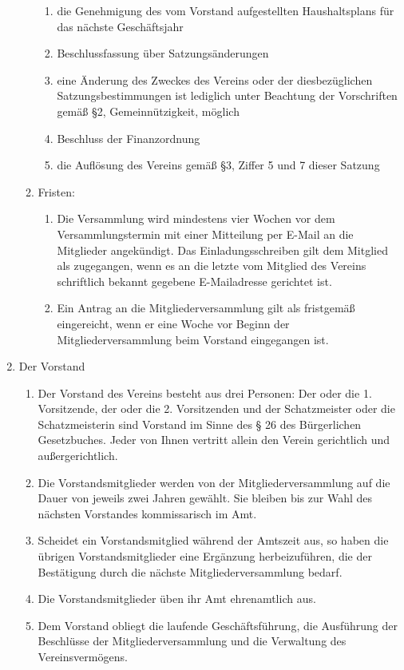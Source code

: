 \documentclass[parskip=half]{scrartcl}
\begin{document}
\begin{contract}
\begin{enumerate}
\begin{enumerate}
\begin{enumerate}
					\item die Genehmigung des vom Vorstand aufgestellten Haushaltsplans für das nächste Geschäftsjahr
					\item Beschlussfassung über Satzungsänderungen
					\item eine Änderung des Zweckes des Vereins oder der diesbezüglichen Satzungsbestimmungen ist lediglich unter Beachtung der Vorschriften gemäß §2, Gemeinnützigkeit, möglich
					\item Beschluss der Finanzordnung
					\item die Auflösung des Vereins gemäß §3, Ziffer 5 und 7 dieser Satzung
				\end{enumerate}
				\item Fristen:
				\begin{enumerate}
					\item Die Versammlung wird mindestens vier Wochen vor dem Versammlungstermin mit einer Mitteilung per E-Mail an die Mitglieder angekündigt. Das Einladungsschreiben gilt dem Mitglied als zugegangen, wenn es an die letzte vom Mitglied des Vereins schriftlich bekannt gegebene E-Mailadresse gerichtet ist.
					\item Ein Antrag an die Mitgliederversammlung gilt als fristgemäß eingereicht, wenn er eine Woche vor Beginn der Mitgliederversammlung beim Vorstand eingegangen ist.
				\end{enumerate}
			\end{enumerate}
			\item Der Vorstand
			\begin{enumerate}
				\item Der Vorstand des Vereins besteht aus drei Personen: Der oder die 1. Vorsitzende, der oder die 2. Vorsitzenden und der Schatzmeister oder die Schatzmeisterin sind Vorstand im Sinne des § 26 des Bürgerlichen Gesetzbuches. Jeder von Ihnen vertritt allein den Verein gerichtlich und außergerichtlich.
				\item Die Vorstandsmitglieder werden von der Mitgliederversammlung auf die Dauer von jeweils zwei Jahren gewählt. Sie bleiben bis zur Wahl des nächsten Vorstandes kommissarisch im Amt.
				\item Scheidet ein Vorstandsmitglied während der Amtszeit aus, so haben die übrigen Vorstandsmitglieder eine Ergänzung herbeizuführen, die der Bestätigung durch die nächste Mitgliederversammlung bedarf.
				\item Die Vorstandsmitglieder üben ihr Amt ehrenamtlich aus.
				\item Dem Vorstand obliegt die laufende Geschäftsführung, die Ausführung der Beschlüsse der Mitgliederversammlung und die Verwaltung des Vereinsvermögens.

\end{enumerate}
\end{enumerate}
\end{contract}
\end{document}
